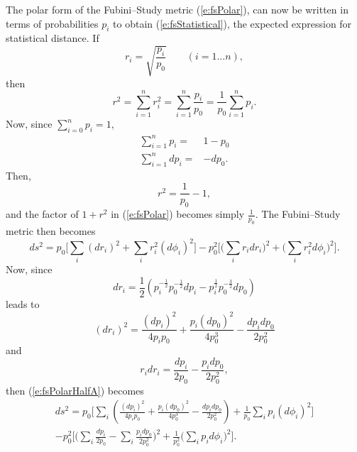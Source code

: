 The polar form of the Fubini--Study metric (\ref{e:fsPolar}),
can now be written in terms of probabilities $p_i$ to obtain 
(\ref{e:fsStatistical}),
the expected expression for statistical distance.
If 
\begin{equation}
r_i = \sqrt{\frac{p_i}{p_0}}\qquad(i= 1\ldots n),
\end{equation}
then 
\begin{equation}
r^2 = \sum_{i=1}^{n} r_i^2 = \sum_{i=1}^{n} \frac{p_i}{p_0}
= \frac{1}{p_0}\sum_{i=1}^n p_i.
\end{equation}
Now, since $\sum_{i=0}^n p_i = 1$,
\begin{equation}
\begin{split}
\sum_{i=1}^n p_i =& 1-p_0\\
\sum_{i=1}^n dp_i =& -dp_0.
\end{split}
\end{equation}
Then,
\begin{equation}
r^2 = \frac{1}{p_0} - 1,
\end{equation}
and the factor of $1+r^2$ in (\ref{e:fsPolar}) 
becomes simply $\frac{1}{p_0}$.
The Fubini--Study metric then becomes
\begin{equation}
ds^2 = p_0 \biggl[\sum_i \left(dr_i\right)^2 + \sum_i r_i^2\left(d\phi_i\right)^2\biggr]
- p_0^2 \biggl[\biggl(\sum_i r_idr_i\biggr)^2
           + \biggl(\sum_i r_i^2d\phi_i\biggr)^2
    \biggr].
\label{e:fsPolarHalfA}
\end{equation}
Now, since
\begin{equation}
dr_i = \frac{1}{2}\left( p_i^{-\frac{1}{2}}p_0^{-\frac{1}{2}} dp_i
                        -p_i^{\frac{1}{2}}p_0^{-\frac{3}{2}} dp_0
                  \right)
\end{equation}
leads to  
\begin{equation}
(dr_i)^2 = \frac{(dp_i)^2}{4p_ip_0}
            + \frac{p_i(dp_0)^2}{4p_0^3}
            - \frac{dp_idp_0}{2p_0^2}
\end{equation}
and
\begin{equation}
r_idr_i = \frac{dp_i}{2p_0} - \frac{p_idp_0}{2p_0^2},
\end{equation}
then (\ref{e:fsPolarHalfA}) becomes
\begin{multline}
ds^2 = p_0 \biggl[
    \sum_i\left( \frac{(dp_i)^2}{4p_ip_0}
                 + \frac{p_i(dp_0)^2}{4p_0^3}
                 - \frac{dp_idp_0}{2p_0^2}
          \right) 
    + \frac{1}{p_0} \sum_i p_i\left(d\phi_i\right)^2\biggr]\\
- p_0^2 \biggl[\biggl(\sum_i\frac{dp_i}{2p_0} 
                      - \sum_i\frac{p_idp_0}{2p_0^2}
               \biggr)^2
           + \frac{1}{p_0^2}\biggl(\sum_i p_id\phi_i\biggr)^2
    \biggr].
\end{multline}
